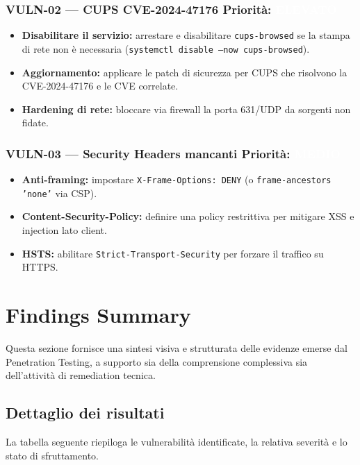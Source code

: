 \documentclass[11pt]{article}
\newcommand{\sev}[2]{%
  \setlength{\fboxsep}{3pt}%
  \colorbox{#1}{\textcolor{white}{\small\textbf{#2}}}%
}
\newcommand{\sevHIGH}{\sev{sevElevato}{ELEVATO}}
\newcommand{\sevMED}{\sev{sevMedio}{MEDIO}}
\begin{document}
\subsubsection{VULN-02 — CUPS CVE-2024-47176 \hfill Priorità: \sevHIGH}
\begin{itemize}[leftmargin=*]
    \item \textbf{Disabilitare il servizio:} arrestare e disabilitare \texttt{cups-browsed} se la stampa di rete non è necessaria (\texttt{systemctl disable --now cups-browsed}).
    \item \textbf{Aggiornamento:} applicare le patch di sicurezza per CUPS che risolvono la CVE-2024-47176 e le CVE correlate.
    \item \textbf{Hardening di rete:} bloccare via firewall la porta 631/UDP da sorgenti non fidate.
\end{itemize}

\subsubsection{VULN-03 — Security Headers mancanti \hfill Priorità: \sevMED}
\begin{itemize}[leftmargin=*]
    \item \textbf{Anti-framing:} impostare \texttt{X-Frame-Options: DENY} (o \texttt{frame-ancestors 'none'} via CSP).
    \item \textbf{Content-Security-Policy:} definire una policy restrittiva per mitigare XSS e injection lato client.
    \item \textbf{HSTS:} abilitare \texttt{Strict-Transport-Security} per forzare il traffico su HTTPS.
\end{itemize}


\section{Findings Summary}
Questa sezione fornisce una sintesi visiva e strutturata delle evidenze emerse dal Penetration Testing, a supporto sia della comprensione complessiva sia dell'attività di remediation tecnica.

\subsection{Dettaglio dei risultati}
La tabella seguente riepiloga le vulnerabilità identificate, la relativa severità e lo stato di sfruttamento.
\end{document}

